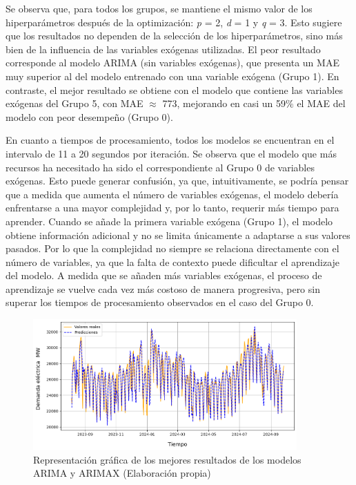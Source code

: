 \documentclass[12pt,a4paper]{report}
\begin{document}
Se observa que, para todos los grupos, se mantiene el mismo valor de los hiperparámetros después de la optimización: \textit{p} = 2, \textit{d} = 1 y \textit{q} = 3. Esto sugiere que los resultados no dependen de la selección de los hiperparámetros, sino más bien de la influencia de las variables exógenas utilizadas. El peor resultado corresponde al modelo ARIMA (sin variables exógenas), que presenta un MAE muy superior al del modelo entrenado con una variable exógena (Grupo 1). En contraste, el mejor resultado se obtiene con el modelo que contiene las variables exógenas del Grupo 5, con MAE $\approx$ 773, mejorando en casi un 59$\%$ el MAE del modelo con peor desempeño (Grupo 0). 

En cuanto a tiempos de procesamiento, todos los modelos se encuentran en el intervalo de 11 a 20 segundos por iteración. Se observa que el modelo que más recursos ha necesitado ha sido el correspondiente al Grupo 0 de variables exógenas. Esto puede generar confusión, ya que, intuitivamente, se podría pensar que a medida que aumenta el número de variables exógenas, el modelo debería enfrentarse a una mayor complejidad y, por lo tanto, requerir más tiempo para aprender. Cuando se añade la primera variable exógena (Grupo 1), el modelo obtiene información adicional y no se limita únicamente a adaptarse a sus valores pasados. Por lo que la complejidad no siempre se relaciona directamente con el número de variables, ya que la falta de contexto puede dificultar el aprendizaje del modelo. A medida que se añaden más variables exógenas, el proceso de aprendizaje se vuelve cada vez más costoso de manera progresiva, pero sin superar los tiempos de procesamiento observados en el caso del Grupo 0.

\begin{figure}[H]
    \centering
    \includegraphics[width=0.9\textwidth]{Images/tfm-4.1(arimax).png}
    \caption{Representación gráfica de los mejores resultados de los modelos ARIMA y ARIMAX (Elaboración propia) }
    \label{fig:figura_ARIMAX}
\end{figure}
\end{document}
